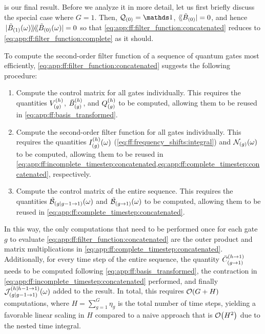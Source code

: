  is our final result.
Before we analyze it in more detail, let us first briefly discuss the special case where $G=1$.
Then, $\liouvQ_{(0)}=\eye$, $\dbra*{\Bt_{(0)}} = 0$, and hence $\dop*{\Bt_{(1)}(\omega)}{\Bt_{(0)}(\omega)} = 0$ so that \cref{eq:app:ff:filter_function:concatenated} reduces to \cref{eq:app:ff:filter_function:complete} as it should.

To compute the second-order filter function of a sequence of quantum gates most efficiently, \cref{eq:app:ff:filter_function:concatenated} suggests the following procedure:
\begin{enumerate}
    \item Compute the control matrix for all gates individually.
        This requires the quantities $V_{(g)}^{(h)}$, $\bar{B}_{(g)}^{(h)}$, and $Q_{(g)}^{(h)}$ to be computed, allowing them to be reused in \cref{eq:app:ff:basis_transformed}.
    \item Compute the second-order filter function for all gates individually.
        This requires the quantities $I_{(g)}^{(h)}(\omega)$ (\cref{eq:ff:frequency_shifts:integral}) and $\mathcal{N}_{(g)}(\omega)$ to be computed, allowing them to be reused in \cref{eq:app:ff:incomplete_timestep:concatenated,eq:app:ff:complete_timestep:concatenated}, respectively.
    \item Compute the control matrix of the entire sequence.
        This requires the quantities $\tilde{\mathcal{B}}_{(g|g-1\to 1)}(\omega)$ and $\tilde{\mathcal{B}}_{(g\to 1)}(\omega)$ to be computed, allowing them to be reused in \cref{eq:app:ff:complete_timestep:concatenated}.
\end{enumerate}
In this way, the only computations that need to be performed once for each gate $g$ to evaluate \cref{eq:app:ff:filter_function:concatenated} are the outer product and matrix multiplications in \cref{eq:app:ff:complete_timestep:concatenated}.
Additionally, for every time step of the entire sequence, the quantity $\bar{C}_{(g\to 1)}^{(h\to 1)}$ needs to be computed following \cref{eq:app:ff:basis_transformed}, the contraction in \cref{eq:app:ff:incomplete_timestep:concatenated} performed, and finally $\mathcal{J}_{(g|g-1\to 1)}^{(h|h-1\to 1)}(\omega)$ added to the result.
In total, this requires $\order{G + H}$ computations, where $H=\sum_{g=1}^{G}\eta_{g}$ is the total number of time steps, yielding a favorable linear scaling in $H$ compared to a naive approach that is $\order{H^2}$ due to the nested time integral.
